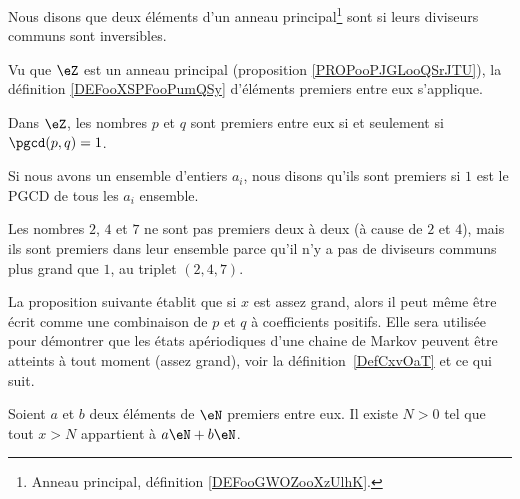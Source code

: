 \begin{definition}      \label{DEFooXSPFooPumQSy}
	Nous disons que deux éléments d'un anneau principal\footnote{Anneau principal, définition \ref{DEFooGWOZooXzUlhK}.} sont  si leurs diviseurs communs sont inversibles.
\end{definition}

Vu que \( \eZ\) est un anneau principal (proposition \ref{PROPooPJGLooQSrJTU}), la définition \ref{DEFooXSPFooPumQSy} d'éléments premiers entre eux s'applique.

\begin{lemma}       \label{LEMooLKLTooXUdsgB}
	Dans \( \eZ\), les nombres \( p\) et \( q\) sont premiers entre eux si et seulement si \( \pgcd(p,q)=1\).
\end{lemma}


\begin{definition}  \label{DefZHRXooNeWIcB}
	Si nous avons un ensemble d'entiers \( a_i\), nous disons qu'ils sont premiers  si \( 1\) est le PGCD de tous les \( a_i\) ensemble.
\end{definition}

Les nombres \( 2\), \( 4\) et \( 7\) ne sont pas premiers deux à deux (à cause de \( 2\) et \( 4\)), mais ils sont premiers dans leur ensemble parce qu'il n'y a pas de diviseurs communs plus grand que \( 1\), au triplet \( (2, 4, 7)\).

La proposition suivante établit que si \( x\) est assez grand, alors il peut même être écrit comme une combinaison de \( p\) et \( q\) à coefficients positifs. Elle sera utilisée pour démontrer que les états apériodiques d'une chaine de Markov peuvent être atteints à tout moment (assez grand), voir la définition~\ref{DefCxvOaT} et ce qui suit.

\begin{proposition}     \label{PropLAbRSE}
	Soient \( a\) et \( b\) deux éléments de \( \eN\) premiers entre eux. Il existe \( N>0\) tel que tout \( x>N\) appartient à \( a\eN+b\eN\).
\end{proposition}

